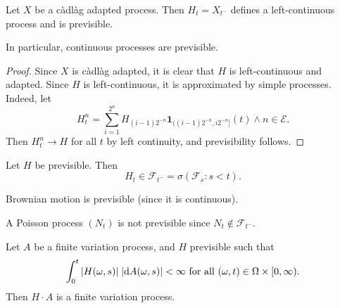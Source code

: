 \documentclass[a4paper]{article}
\begin{document}
\begin{fact}
  Let $X$ be a c\`adl\`ag adapted process. Then $H_t = X_{t^-}$ defines a left-continuous process and is previsible.
\end{fact}
In particular, continuous processes are previsible.

\begin{proof}
  Since $X$ is c\`adl\`ag adapted, it is clear that $H$ is left-continuous and adapted. Since $H$ is left-continuous, it is approximated by simple processes. Indeed, let
  \[
    H_t^n = \sum_{i = 1}^{2^n} H_{(i - 1)2^{-n}} \mathbf{1}_{((i - 1)2^{-n}, i 2^{-n}]} (t) \wedge n \in \mathcal{E}.
  \]
  Then $H_t^n \to H$ for all $t$ by left continuity, and previsibility follows.
\end{proof}

\begin{ex}
  Let $H$ be previsible. Then
  \[
    H_t \in \mathcal{F}_{t^-} = \sigma(\mathcal{F}_s : s < t).
  \]
\end{ex}

\begin{eg}
  Brownian motion is previsible (since it is continuous).
\end{eg}

\begin{eg}
  A Poisson process $(N_t)$ is not previsible since $N_t \not \in \mathcal{F}_{t^-}$.
\end{eg}

\begin{prop}
  Let $A$ be a finite variation process, and $H$ previsible such that
  \[
    \int_0^t |H(\omega, s)|\;|\mathrm{d} A(\omega, s)| < \infty\text{ for all }(\omega, t) \in \Omega \times [0, \infty).
  \]
  Then $H \cdot A$ is a finite variation process.
\end{prop}
\end{document}
